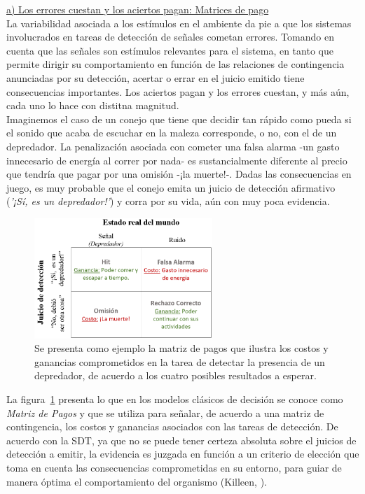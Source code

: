       \underline{a) Los errores cuestan y los aciertos pagan: Matrices de pago}\\

La variabilidad asociada a los estímulos en el ambiente da pie a que los sistemas involucrados en tareas de detección de señales cometan errores. Tomando en cuenta que las señales son estímulos relevantes para el sistema, en tanto que permite dirigir su comportamiento en función de las relaciones de contingencia anunciadas por su detección, acertar o errar en el juicio emitido tiene consecuencias importantes. Los aciertos pagan y los errores cuestan, y más aún, cada uno lo hace con distitna magnitud.\\

Imaginemos el caso de un conejo que tiene que decidir tan rápido como pueda si el sonido que acaba de escuchar en la maleza corresponde, o no, con el de un depredador. La penalización asociada con cometer una falsa alarma -un gasto innecesario de energía al correr por nada- es sustancialmente diferente al precio que tendría que pagar por una omisión -¡la muerte!-. Dadas las consecuencias en juego, es muy probable que el conejo emita un juicio de detección afirmativo (\textit{'¡Sí, es un depredador!'}) y corra por su vida, aún con muy poca evidencia.\\

\begin{figure}[th]
\centering
\includegraphics[width=0.60\textwidth]{Figures/Matriz_Pagos} 
\caption[Ejemplo de Matriz de Pagos]{Se presenta como ejemplo la matriz de pagos que ilustra los costos y ganancias comprometidos en la tarea de detectar la presencia de un depredador, de acuerdo a los cuatro posibles resultados a esperar.}
\label{fig:Mat_Pagos}
\end{figure}

La figura~\ref{fig:Mat_Pagos} presenta lo que en los modelos clásicos de decisión se conoce como \textit{Matriz de Pagos} y que se utiliza para señalar, de acuerdo a una matriz de contingencia, los costos y ganancias asociados con las tareas de detección. De acuerdo con la SDT, ya que no se puede tener certeza absoluta sobre el juicios de detección a emitir, la evidencia es juzgada en función a un criterio de elección que toma en cuenta las consecuencias comprometidas en su entorno, para guiar de manera óptima el comportamiento del organismo (Killeen, \citeyear{Killeen2014}).\\

